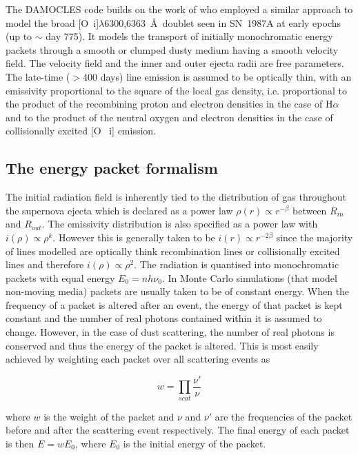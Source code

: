 \documentclass[useAMS,usenatbib,usegraphicx]{mnras}
\begin{document}
The DAMOCLES code builds on the work of \citet{Lucy1989} who employed a 
similar approach to model the broad [O~{\sc i}]$\lambda$6300,6363~\AA\ doublet 
seen in SN~1987A at early epochs (up to $\sim$ day 775).  It models the 
transport of initially monochromatic energy packets through a smooth or 
clumped dusty medium having a smooth velocity field. The velocity field 
and the inner and outer ejecta radii are free parameters. The late-time 
($>$400 days) line emission is assumed to be optically thin, with an 
emissivity proportional to the square of the local gas density, i.e. 
proportional to the product of the recombining proton and electron 
densities in the case of H$\alpha$ and to the product of the neutral 
oxygen and electron densities in the case of collisionally excited [O~{\sc 
i}] emission.

\subsection{The energy packet formalism}
\label{packets}

The initial radiation field is inherently tied to the distribution of gas 
throughout the supernova ejecta which is declared as a power law $\rho(r) 
\propto r^{-\beta}$ between $R_{in}$ and $R_{out}$. The emissivity 
distribution is also specified as a power law with $i(\rho) \propto 
\rho^{k}$.  However this is generally taken to be $i(r) \propto r 
^{-2\beta}$ since the majority of lines modelled are optically think recombination lines or collisionally excited lines
and therefore $i(\rho) \propto \rho^2$.  The radiation is quantised into 
monochromatic packets with equal energy $E_{0}=nh\nu_{0}$.  In Monte Carlo 
simulations (that model non-moving media) packets are usually taken 
to be of constant energy.  When the frequency of a packet is altered after 
an event, the energy of that packet is kept constant and the number of 
real photons contained within it is assumed to change.  However, in the case 
of dust scattering, the number of real photons is conserved and thus the 
energy of the packet is altered.  This is most easily achieved by 
weighting each packet over all scattering events as 

\begin{equation}
w=\prod_{scat} \frac{\nu'}{\nu}
\end{equation} 

\noindent where $w$ is the weight of the packet and $\nu$ and $\nu'$ are the frequencies of the packet before and after the scattering event respectively.  The final 
energy of each packet is then $E=wE_0$, where $E_0$ is the initial energy 
of the packet.
\end{document}
